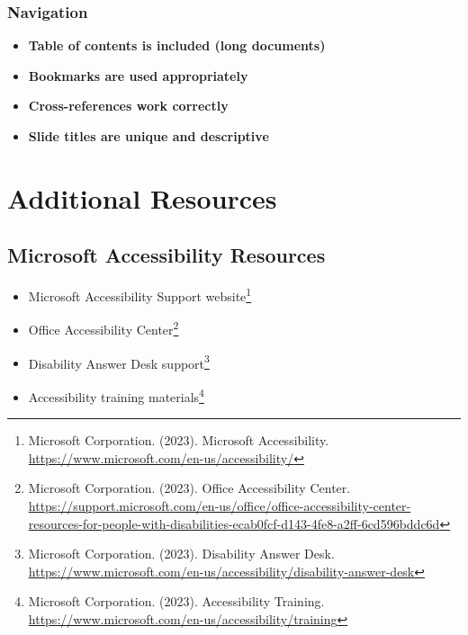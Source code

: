 \subsubsection{Navigation}
\begin{itemize}
\item[\checkmark] \textbf{Table of contents is included (long documents)}
\item[\checkmark] \textbf{Bookmarks are used appropriately}
\item[\checkmark] \textbf{Cross-references work correctly}
\item[\checkmark] \textbf{Slide titles are unique and descriptive}
\end{itemize}

\section{Additional Resources}
\label{sec:additional-resources}

\subsection{Microsoft Accessibility Resources}
\begin{itemize}
\item Microsoft Accessibility Support website\footnote{Microsoft Corporation. (2023). Microsoft Accessibility. \url{https://www.microsoft.com/en-us/accessibility/}}
\item Office Accessibility Center\footnote{Microsoft Corporation. (2023). Office Accessibility Center. \url{https://support.microsoft.com/en-us/office/office-accessibility-center-resources-for-people-with-disabilities-ecab0fcf-d143-4fe8-a2ff-6cd596bddc6d}}
\item Disability Answer Desk support\footnote{Microsoft Corporation. (2023). Disability Answer Desk. \url{https://www.microsoft.com/en-us/accessibility/disability-answer-desk}}
\item Accessibility training materials\footnote{Microsoft Corporation. (2023). Accessibility Training. \url{https://www.microsoft.com/en-us/accessibility/training}}
\end{itemize}

